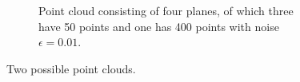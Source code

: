 \begin{figure}
\begin{subfigure}{.45\textwidth}
        \caption{Point cloud consisting of four planes, of which three have 50 points and one has 400 points with noise $\epsilon=0.01$.}
    \end{subfigure}
    \caption{Two possible point clouds.} \label{fig:point_cloud_examples}
\end{figure}